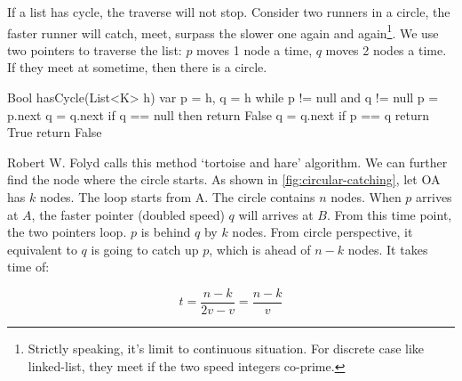 \documentclass[b5paper]{article}
\begin{document}
\begin{Answer}[ref = {ex:list-others}]
{\begin{center}
\label{fig:circular-list}
\end{center}

If a list has cycle, the traverse will not stop. Consider two runners in a circle, the faster runner will catch, meet, surpass the slower one again and again\footnote{Strictly speaking, it's limit to continuous situation. For discrete case like linked-list, they meet if the two speed integers co-prime.}. We use two pointers to traverse the list: $p$ moves 1 node a time, $q$ moves 2 nodes a time. If they meet at sometime, then there is a circle.

\begin{Bourbaki}
Bool hasCycle(List<K> h) {
    var p = h, q = h
    while p != null and q != null {
        p = p.next
        q = q.next
        if q == null then return False
        q = q.next
        if p == q return True
    }
    return False
}
\end{Bourbaki}

Robert W. Folyd calls this method `tortoise and hare' algorithm. We can further find the node where the circle starts. As shown in \cref{fig:circular-catching}, let OA has $k$ nodes. The loop starts from A. The circle contains $n$ nodes. When $p$ arrives at $A$, the faster pointer (doubled speed) $q$ will arrives at $B$. From this time point, the two pointers loop. $p$ is behind $q$ by $k$ nodes. From circle perspective, it equivalent to $q$ is going to catch up $p$, which is ahead of $n - k$ nodes. It takes time of:

\[
 t = \dfrac{n - k}{2v - v} = \dfrac{n - k}{v}
\]

\begin{center}
\end{center}}
\end{Answer}
\end{document}
